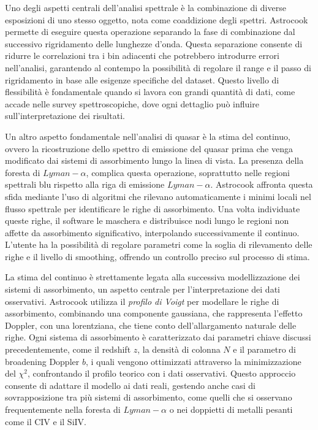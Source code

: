 \documentclass[a4paper,12pt]{article}
\begin{document}
Uno degli aspetti centrali dell'analisi spettrale è la combinazione di diverse esposizioni di uno stesso oggetto, nota come coaddizione degli spettri. Astrocook permette di eseguire questa operazione separando la fase di combinazione dal successivo rigridamento delle lunghezze d’onda. Questa separazione consente di ridurre le correlazioni tra i bin adiacenti che potrebbero introdurre errori nell'analisi, garantendo al contempo la possibilità di regolare il range e il passo di rigridamento in base alle esigenze specifiche del dataset. Questo livello di flessibilità è fondamentale quando si lavora con grandi quantità di dati, come accade nelle survey spettroscopiche, dove ogni dettaglio può influire sull'interpretazione dei risultati.

Un altro aspetto fondamentale nell'analisi di quasar è la stima del continuo, ovvero la ricostruzione dello spettro di emissione del quasar prima che venga modificato dai sistemi di assorbimento lungo la linea di vista. La presenza della foresta di $Lyman-\alpha$, complica questa operazione, soprattutto nelle regioni spettrali blu rispetto alla riga di emissione $Lyman-\alpha$. Astrocook affronta questa sfida mediante l'uso di algoritmi che rilevano automaticamente i minimi locali nel flusso spettrale per identificare le righe di assorbimento. Una volta individuate queste righe, il software le maschera e distribuisce nodi lungo le regioni non affette da assorbimento significativo, interpolando successivamente il continuo. L'utente ha la possibilità di regolare parametri come la soglia di rilevamento delle righe e il livello di smoothing, offrendo un controllo preciso sul processo di stima.

La stima del continuo è strettamente legata alla successiva modellizzazione dei sistemi di assorbimento, un aspetto centrale per l'interpretazione dei dati osservativi. Astrocook utilizza il \textit{profilo di Voigt} per modellare le righe di assorbimento, combinando una componente gaussiana, che rappresenta l’effetto Doppler, con una lorentziana, che tiene conto dell’allargamento naturale delle righe. Ogni sistema di assorbimento è caratterizzato dai parametri chiave discussi precedentemente, come il redshift $z$, la densità di colonna $N$ e il parametro di broadening Doppler $b$, i quali vengono ottimizzati attraverso la minimizzazione del $\chi^2$, confrontando il profilo teorico con i dati osservativi. Questo approccio consente di adattare il modello ai dati reali, gestendo anche casi di sovrapposizione tra più sistemi di assorbimento, come quelli che si osservano frequentemente nella foresta di $Lyman-\alpha$ o nei doppietti di metalli pesanti come il CIV e il SiIV.
\end{document}

